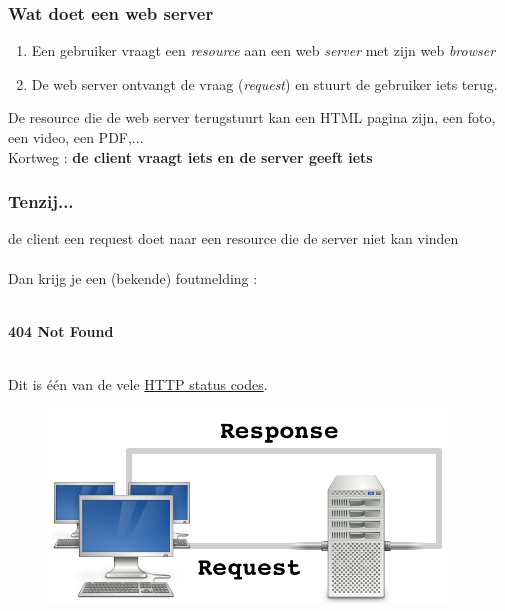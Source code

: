 \documentclass{beamer}
\begin{document}
\begin{frame}

\frametitle{Wat doet een web server}

{\Large \begin{enumerate}
  \item Een gebruiker vraagt een \textit{resource} aan een web \textit{server} met zijn web \textit{browser}
  \item De web server ontvangt de vraag (\textit{request}) en stuurt de gebruiker iets terug.
\end{enumerate}

De resource die de web server terugstuurt kan een HTML pagina zijn, een foto, een video, een PDF,...\\
Kortweg : \textbf{de client vraagt iets en de server geeft iets}}

\end{frame}


\begin{frame}

\frametitle{\textbf{Tenzij...}}

{\Large de client een request doet naar een resource die de server niet kan vinden\\~\\
Dan krijg je een (bekende) foutmelding :\\~\\}

\begin{center}
{\huge \textbf{{404 Not Found}}}\\~\\
\end{center}

{\Large Dit is \'e\'en van de vele \href{https://en.wikipedia.org/wiki/List_of_HTTP_status_codes}{HTTP status codes}.}

\end{frame}


\begin{frame}

\begin{figure}

\includegraphics[width=300pt]{ClientsAndServers.png}

\end{figure}

\end{frame}
\end{document}
